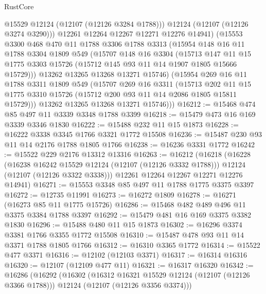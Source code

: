 \begin{lexlean}{RustCore}
\begin{coremodule}
            @15529
            @12124
            (@12107 (@12126 @3284 @1788)))
          @12124
          (@12107 (@12126 @3274 @3290)))
        @12261
        @12264
        @12267
        @12271
        @12276
        @14941)
      (@15553
        @3300
        @468
        @470
        @11
        @1788
        @3306
        @1788
        @3313
        (@15954
          @148
          @16
          @11
          @1788
          @3304
          @1809
          @549
          (@15707
            @148
            @16
            @3304
            (@15713
              @147
              @11
              @15
              @1775
              @3303
              @15726
              (@15712 @145 @93 @11 @14 @1907 @1805 @15666 @15729)))
          @13262
          @13265
          @13268
          @13271
          @15746)
        (@15954
          @269
          @16
          @11
          @1788
          @3311
          @1809
          @549
          (@15707
            @269
            @16
            @3311
            (@15713
              @202
              @11
              @15
              @1775
              @3310
              @15726
              (@15712 @200 @93 @11 @14 @2086 @1805 @15811 @15729)))
          @13262
          @13265
          @13268
          @13271
          @15746)))
@16212 := @15468 @474 @85 @497 @11 @3339 @3348 @1788 @3399
@16218 := @15479 @473 @16 @169 @3339 @3346 @1830
@16222 := @15488 @232 @11 @15 @1873
@16228 := @16222 @3338 @3345 @1766 @3321 @1772 @15508
@16236 := @15487 @230 @93 @11 @14 @2176 @1788 @1805 @1766
@16238 := @16236 @3331 @1772
@16242 := @15522 @229 @2176 @13312 @13316
@16263 := @16212
    (@16218
      (@16228
        (@16238 @16242 @15529 @12124 (@12107 (@12126 @3332 @1788)))
        @12124
        (@12107 (@12126 @3322 @3338)))
      @12261
      @12264
      @12267
      @12271
      @12276
      @14941)
@16271 := @15553 @3348 @85 @497 @11 @1788 @1775 @3375 @3397
@16272 := @12735 @11991
@16273 := @16272 @1809
@16278 := @16271 (@16273 @85 @11 @1775 @15726)
@16286 := @15468 @482 @489 @496 @11 @3375 @3384 @1788 @3397
@16292 := @15479 @481 @16 @169 @3375 @3382 @1830
@16296 := @15488 @480 @11 @15 @1873
@16302 := @16296 @3374 @3381 @1766 @3355 @1772 @15508
@16310 := @15487 @478 @93 @11 @14 @3371 @1788 @1805 @1766
@16312 := @16310 @3365 @1772
@16314 := @15522 @477 @3371
@16316 := @12102 (@12103 @3371)
@16317 := @16314 @16316
@16320 := @12107 (@12109 @477 @11)
@16321 := @16317 @16320
@16342 := @16286
    (@16292
      (@16302
        (@16312 @16321 @15529 @12124 (@12107 (@12126 @3366 @1788)))
        @12124
        (@12107 (@12126 @3356 @3374)))

\end{coremodule}
\end{lexlean}
